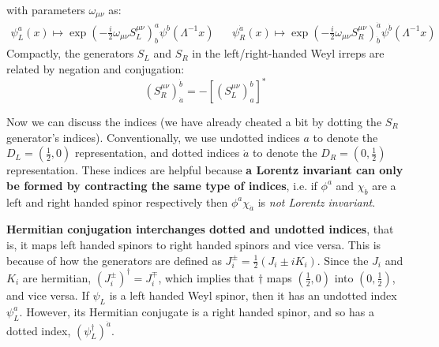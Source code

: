 \documentclass[11pt, oneside]{article}   	%
\theoremstyle{definition}
\begin{document}
with parameters $\omega_{\mu\nu}$ as:
\begin{align}
	\psi_L^a(x)\mapsto \exp\left(-\frac{i}{2} \omega_{\mu\nu}S_L^{\mu\nu}\right)^a_b \psi^b(\Lambda^{-1}x) &&
	\psi_R^{\dot a}(x)\mapsto \exp\left(-\frac{i}{2} \omega_{\mu\nu}S_R^{\mu\nu}\right)^{\dot a}_{\dot b} \psi^{\dot b}(\Lambda^{-1}x)
\end{align}
Compactly, the generators $S_L$ and $S_R$ in the left/right-handed Weyl irreps are related by negation and conjugation:
\begin{equation}
	(S_R^{\mu\nu})_{\dot a}^{\dot b} = - [(S_L^{\mu\nu})_a^b]^*
\end{equation}

Now we can discuss the indices (we have already cheated a bit by dotting the $S_R$ generator's indices). Conventionally, we use undotted 
indices $a$ to denote the $D_L = (\frac{1}{2}, 0)$ representation, and dotted indices $\dot a$ to denote the $D_R = (0, \frac{1}{2})$ 
representation. These indices are helpful because \textbf{a Lorentz invariant can only be formed by contracting the same type of indices}, i.e. 
if $\phi^a$ and $\chi_{\dot b}$ are a left and right handed spinor respectively then $\phi^a\chi_{\dot a}$ is \textit{not Lorentz invariant}. 

\textbf{Hermitian conjugation interchanges dotted and undotted indices}, that is, it maps left handed spinors to right handed spinors and vice 
versa. This is because of how the generators are defined as $J^\pm_i = \frac{1}{2} (J_i\pm i K_i)$. Since the $J_i$ and $K_i$ are hermitian, 
$(J_i^\pm)^\dagger = J_i^\mp$, which implies that $\dagger$ maps $(\frac{1}{2}, 0)$ into $(0, \frac{1}{2})$, and vice versa. If $\psi_L$ is a left 
handed Weyl spinor, then it has an undotted index $\psi_L^a$. However, its Hermitian conjugate is a right handed spinor, and so has a 
dotted index, $(\psi_L^\dagger)^{\dot a}$. 

\end{document}
